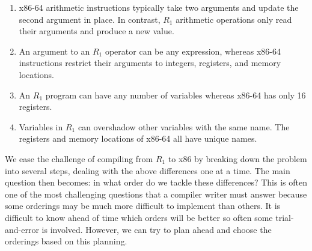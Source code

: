 \documentclass[11pt]{book}
\begin{document}
\begin{enumerate}
\item x86-64 arithmetic instructions typically take two arguments and
  update the second argument in place. In contrast, $R_1$ arithmetic
  operations only read their arguments and produce a new value.

\item An argument to an $R_1$ operator can be any expression, whereas
  x86-64 instructions restrict their arguments to integers, registers,
  and memory locations.

\item An $R_1$ program can have any number of variables whereas x86-64
  has only 16 registers.

\item Variables in $R_1$ can overshadow other variables with the same
  name. The registers and memory locations of x86-64 all have unique
  names.
\end{enumerate}

We ease the challenge of compiling from $R_1$ to x86 by breaking down
the problem into several steps, dealing with the above differences one
at a time. The main question then becomes: in what order do we tackle
these differences? This is often one of the most challenging questions
that a compiler writer must answer because some orderings may be much
more difficult to implement than others. It is difficult to know ahead
of time which orders will be better so often some trial-and-error is
involved. However, we can try to plan ahead and choose the orderings
based on this planning.
\end{document}
